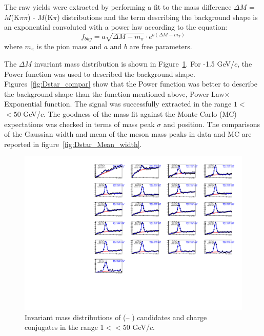 The \Dstar raw yields were extracted by performing a fit to the mass difference $\Delta M$ = $M$(K$\pi\pi$) - $M$(K$\pi$) distributions and the term describing the background shape is an exponential convoluted with a power law according to the equation:
\begin{equation}
	f_{bkg} = a\sqrt{\Delta M - m_{\pi}}\cdot e^{b(\Delta M - m_{\pi})}
\end{equation}
where $m_{\pi}$ is the pion mass and $a$ and $b$ are free parameters.

The \Dstar $\Delta M$ invariant mass distribution is shown in Figure~\ref{fig:Dstar_InvMass}. For -1.5 GeV/$c$, the Power function was used to described the background shape. Figures~\ref{fig:Dstar_compar} show that the Power function was better to describe the background shape than the function mentioned above, Power Law$\times$Exponential function. The \Dstar signal was successfully extracted in the range $1<$\pt$<50$ GeV/$c$. The goodness of the mass fit against the Monte Carlo (MC) expectations was checked in terms of mass peak $\sigma$ and position.
The comparisons of the Gaussian width and mean of the \Dstar meson mass peaks in data and MC are reported in figure~\ref{fig:Dstar_Mean_width}.


\begin{figure}[tb]
\begin{center}
 \includegraphics[width=1\textwidth]{figures/Dstar/pp13TeV/DstarInvMass_new.pdf}
\caption{Invariant mass distributions of  (\Dstar -- \Dzero) candidates and charge conjugates in the range 1$<$\pt$<$50 GeV/$c$.}
\label{fig:Dstar_InvMass}
\end{center}
\end{figure}


